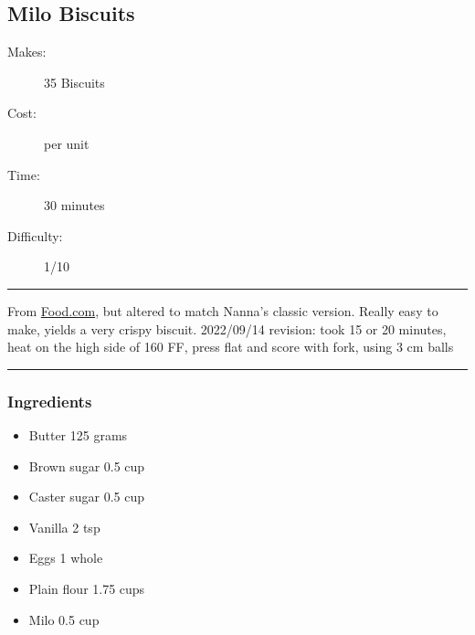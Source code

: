 \documentclass[]{article}
\begin{document}
\subsection*{\center\huge Milo Biscuits}
\begin{description}
\item[Makes:] 35 Biscuits
\item[Cost:]  per unit
\item[Time:] 30 minutes
\item[Difficulty:] 1/10
\end{description}
\vspace{0.2cm}\hrule\vspace{0.5cm}
\begin{adjustwidth}{0.5 cm}{0.5 cm}

From \href{https://www.food.com/recipe/jessgarfields-milo-biscuits-123173}{Food.com}, but altered to match Nanna’s classic version. Really easy to make, yields a very crispy biscuit. 2022/09/14 revision: took 15 or 20 minutes, heat on the high side of 160 FF, press flat and score with fork, using 3 cm balls \hfill{}\color{black}

\end{adjustwidth}
\vspace{0.5cm}\hrule
\subsubsection*{\Large Ingredients}
\begin{multicols}{2}
\begin{itemize}
 \item Butter \hfill 125 grams
 \item Brown sugar \hfill 0.5 cup
 \item Caster sugar \hfill 0.5 cup
 \item Vanilla \hfill 2 tsp
 \item Eggs \hfill 1 whole
 \item Plain flour \hfill 1.75 cups
 \item Milo \hfill 0.5 cup
\end{itemize}
\end{multicols}
\end{document}
